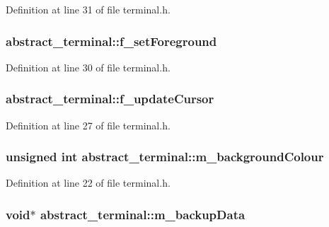 Definition at line 31 of file terminal.h.

\hypertarget{structabstract__terminal_ad23d8fe1e792c8c66abc9d8231e97e27}{
\subsubsection[{f\_\-setForeground}]{ {\bf abstract\_\-terminal::f\_\-setForeground}}}
\label{structabstract__terminal_ad23d8fe1e792c8c66abc9d8231e97e27}


Definition at line 30 of file terminal.h.

\hypertarget{structabstract__terminal_a730a4834d172b670d418603857e5bb75}{
\subsubsection[{f\_\-updateCursor}]{ {\bf abstract\_\-terminal::f\_\-updateCursor}}}
\label{structabstract__terminal_a730a4834d172b670d418603857e5bb75}


Definition at line 27 of file terminal.h.

\hypertarget{structabstract__terminal_a1ff90f4c00bf5d9b438ca6709a2ecdfc}{
\subsubsection[{m\_\-backgroundColour}]{\setlength{\rightskip}{0pt plus 5cm}unsigned int {\bf abstract\_\-terminal::m\_\-backgroundColour}}}
\label{structabstract__terminal_a1ff90f4c00bf5d9b438ca6709a2ecdfc}


Definition at line 22 of file terminal.h.

\hypertarget{structabstract__terminal_a57610561db71a58777d226a2016fe1a1}{
\subsubsection[{m\_\-backupData}]{\setlength{\rightskip}{0pt plus 5cm}void$\ast$ {\bf abstract\_\-terminal::m\_\-backupData}}}
\label{structabstract__terminal_a57610561db71a58777d226a2016fe1a1}


